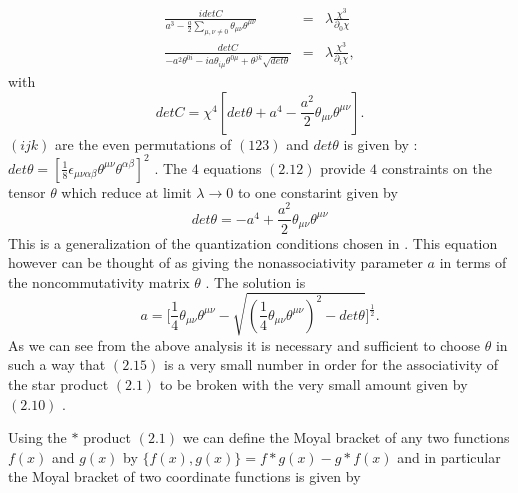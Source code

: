 \documentclass[a4paper,12pt]{article}
\begin{document}
\begin{eqnarray}
\frac{idetC}{a^3 -\frac{a}{2}\sum_{{\mu},{\nu}{\neq}0}{\theta}_{{\mu}{\nu}}{\theta}^{{\mu}{\nu}}}&=&{\lambda}\frac{{\chi}^3}{{\partial}_{0}{\chi}}\nonumber\\
\frac{detC}{-a^2{\theta}^{0i} -
ia{\theta}_{i{\mu}}{\theta}^{0{\mu}}
+{\theta}^{jk}\sqrt{det{\theta}}}&=&{\lambda}\frac{{\chi}^3}{{\partial}_{i}{\chi}},
\end{eqnarray}
with
\begin{equation}
detC={\chi}^4[det{\theta} + a^4 -
\frac{a^2}{2}{\theta}_{{\mu}{\nu}}{\theta}^{{\mu}{\nu}}].
\end{equation}
$(ijk)$ are the even permutations of $(123)$ and $det{\theta}$ is
given by : $
det{\theta}=[\frac{1}{8}{\epsilon}_{{\mu}{\nu}{\alpha}{\beta}}{\theta}^{{\mu}{\nu}}{\theta}^{{\alpha}{\beta}}]^2
$ . The $4$ equations $(2.12)$ provide $4$ constraints on the
tensor $\theta$ which reduce at limit
${\lambda}{\longrightarrow}0$ to one constarint given by
\begin{equation}
det{\theta} =- a^4 +
\frac{a^2}{2}{\theta}_{{\mu}{\nu}}{\theta}^{{\mu}{\nu}}
\end{equation}
This is a generalization of the quantization conditions chosen in
\cite{dop} . This equation however can be thought of as giving
the nonassociativity parameter $a$ in terms of the
noncommutativity matrix ${\theta}$ . The solution is
\begin{equation}
a=\bigg[\frac{1}{4}{\theta}_{{\mu}{\nu}}{\theta}^{{\mu}{\nu}} -
\sqrt{(\frac{1}{4}{\theta}_{{\mu}{\nu}}{\theta}^{{\mu}{\nu}})^2 -
det{\theta}}\bigg]^{\frac{1}{2}}.
\end{equation}
 As we can see from the above analysis it is
necessary and sufficient to choose ${\theta}$ in such a way that
 $(2.15)$ is a very small number in order for the associativity
of the star product $(2.1)$ to be broken with the very small
amount given by $(2.10)$ .


Using the $*$ product $(2.1)$ we can define the Moyal bracket of
any two functions $f(x)$ and $g(x)$ by $\{f(x),g(x)\}=f*g(x) -
g*f(x)$ and in particular the Moyal bracket of two coordinate
functions is given by
\end{document}
